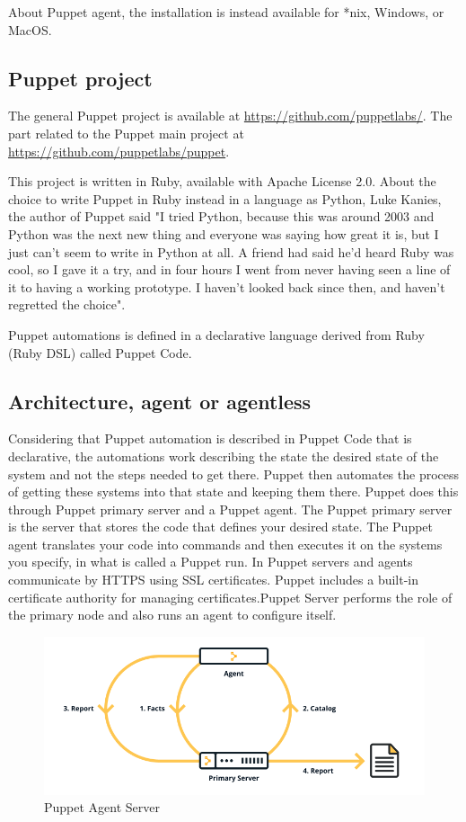 \documentclass[12pt,a4paper,openright,twoside]{book}
\begin{document}
About Puppet agent, the installation is instead available for *nix, Windows, or MacOS.
\cite{puppetDocSupportAgents}

\subsection{Puppet project}
The general Puppet project is available at \url{https://github.com/puppetlabs/}.
The part related to the Puppet main project at \url{https://github.com/puppetlabs/puppet}.

This project is written in Ruby, available with Apache License 2.0\cite{puppetGitHubProject}.
About the choice to write Puppet in Ruby instead in a language as Python, Luke Kanies, the author of Puppet said "I tried Python, because this was around 2003 and Python was the next new thing and everyone was saying how great it is, but I just can't seem to write in Python at all. A friend had said he'd heard Ruby was cool, so I gave it a try, and in four hours I went from never having seen a line of it to having a working prototype. I haven't looked back since then, and haven't regretted the choice"\cite{puppetDocOldFAQ}.

Puppet automations is defined in a declarative language derived from Ruby (Ruby DSL) called Puppet Code.

\subsection{Architecture, agent or agentless}
Considering that Puppet automation is described in Puppet Code that is declarative, the automations work describing the state the desired state of the system and not the steps needed to get there.
Puppet then automates the process of getting these systems into that state and keeping them there.
Puppet does this through Puppet primary server and a Puppet agent.
The Puppet primary server is the server that stores the code that defines your desired state.
The Puppet agent translates your code into commands and then executes it on the systems you specify, in what is called a Puppet run\cite{puppetDocWhatIs}.
In Puppet servers and agents communicate by HTTPS using SSL certificates. Puppet includes a built-in certificate authority for managing certificates.Puppet Server performs the role of the primary node and also runs an agent to configure itself\cite{puppetDocPlatform}.

\begin{figure}[H]
    \centering
    \includegraphics[width=.8\linewidth]{figures/puppetagentserverjpeg.png}
    \caption{Puppet Agent Server}
    \label{fig:chef-agent-server-image}
\end{figure}\cite{puppetDocWhatIs}
\end{document}
